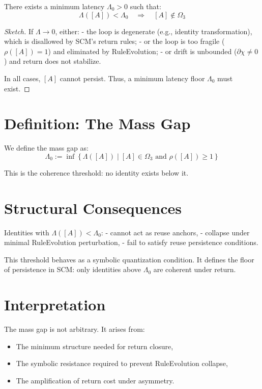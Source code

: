 \begin{definition} \label{thm:mass-gap}
There exists a minimum latency $\Lambda_0 > 0$ such that:
\[
\Lambda([A]) < \Lambda_0 \quad \Rightarrow \quad [A] \notin \Omega_3
\]
\end{definition}

\begin{proof}[Sketch]
If $\Lambda \to 0$, either:
- the loop is degenerate (e.g., identity transformation), which is disallowed by SCM's return rules;
- or the loop is too fragile ($\rho([A]) = 1$) and eliminated by RuleEvolution;
- or drift is unbounded ($\partial\chi \ne 0$) and return does not stabilize.

In all cases, $[A]$ cannot persist. Thus, a minimum latency floor $\Lambda_0$ must exist.
\end{proof}

\section{Definition: The Mass Gap}

We define the mass gap as:
\begin{equation} \label{eq:mass-gap-definition}
\Lambda_0 := \inf \left\{ \Lambda([A]) \mid [A] \in \Omega_3 \text{ and } \rho([A]) \geq 1 \right\}
\end{equation}

This is the coherence threshold: no identity exists below it.

\section{Structural Consequences}

Identities with $\Lambda([A]) < \Lambda_0$:
- cannot act as reuse anchors,
- collapse under minimal RuleEvolution perturbation,
- fail to satisfy reuse persistence conditions.

This threshold behaves as a symbolic quantization condition. It defines the floor of persistence in SCM: only identities above $\Lambda_0$ are coherent under return.

\section{Interpretation}

The mass gap is not arbitrary. It arises from:
\begin{itemize}
  \item The minimum structure needed for return closure,
  \item The symbolic resistance required to prevent RuleEvolution collapse,
  \item The amplification of return cost under asymmetry.
\end{itemize}

